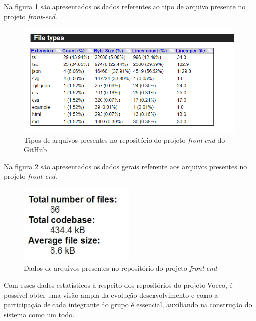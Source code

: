 Na figura \ref{fig:tiposdeArquivosFront} são apresentados os dados referentes ao tipo de arquivo presente no projeto \textit{front-end}.

\begin{figure}[ht]
        \centering
\includegraphics[width=1.0\textwidth]{images/tipos-arquivos-stats-front.png}
        \caption{Tipos de arquivos presentes no repositório do projeto \textit{front-end} do GitHub}
        \label{fig:tiposdeArquivosFront}
    \end{figure}

\newpage


Na figura \ref{fig:infoArquivosFront} são apresentados os dados gerais referente aos arquivos presentes no projeto \textit{front-end}.

    \begin{figure}[ht]
        \centering
\includegraphics[width=0.5\textwidth]{images/info-arquivos-stats-front.jpg}
        \caption{Dados de arquivos presentes no repositório do projeto \textit{front-end}}
        \label{fig:infoArquivosFront}
    \end{figure}


Com esses dados estatísticos à respeito dos repositórios do projeto Vocco, é possível obter uma visão ampla da evolução desenvolvimento e como a participação de cada integrante do grupo é essencial, auxiliando na construção do sistema como um todo.